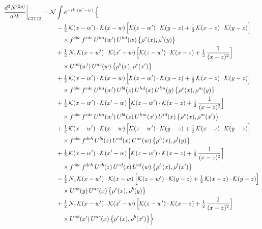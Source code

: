 \documentclass[10pt]{article}
\numberwithin{equation}{section}
\newcommand{\KK}{\mathcal K}
\newcommand{\NN}{\mathcal N}
\begin{document}
\begin{align}
\frac{d^3N^{(2\rho)}}{d^3k}\bigg|_{\rm GII.I2}={}&\NN\int e^{-ik\cdot(w'-w)}\,\Big\{\notag\\
&\quad -\tfrac12\,\KK(x-w')\cdot\KK(x-w)\,\Big[\KK(z-w')\cdot\KK(y-z)+\tfrac12\,\KK(x-z)\cdot\KK(y-z)\Big]\notag\\
&\qquad\times f^{abc}\,f^{cde}\,U^{ha}(w')\,U^{hd}(w)\,\big\{\rho^{e}(x),\rho^{b}(y)\big\}\notag\\
&\quad +\tfrac12\,N_{c}\,\KK(x-w')\cdot\KK(x'-w)\,\Big[\KK(z-w')\cdot\KK(x-z)+\tfrac12\,\frac{1}{(x-z)^2}\Big]\notag\\
&\qquad\times U^{ab}(w')\,U^{ac}(w)\,\big\{\rho^{b}(x),\rho^{c}(x')\big\}\notag\\
&\quad +\tfrac12\,\KK(x-w')\cdot\KK(x-w)\,\Big[\KK(z-w')\cdot\KK(y-z)+\tfrac12\,\KK(x-z)\cdot\KK(y-z)\Big]\notag\\
&\qquad\times f^{abc}\,f^{cde}\,U^{ha}(w')\,U^{bl}(z)\,U^{hd}(x)\,U^{lm}(y)\,\big\{\rho^{e}(x),\rho^{m}(y)\big\}\notag\\
&\quad +\tfrac12\,\KK(x-w')\cdot\KK(x'-w)\,\Big[\KK(z-w')\cdot\KK(x-z)+\tfrac12\,\frac{1}{(x-z)^2}\Big]\notag\\
&\qquad\times f^{abc}\,f^{cde}\,U^{ha}(w')\,U^{bl}(z)\,U^{hm}(x')\,U^{ld}(x)\,\big\{\rho^{e}(x),\rho^{m}(x')\big\}\notag\\
&\quad +\tfrac12\,\KK(x-w')\cdot\KK(x-w)\,\Big[\KK(z-w')\cdot\KK(y-z)+\tfrac12\,\KK(x-z)\cdot\KK(y-z)\Big]\notag\\
&\qquad\times f^{abc}\,f^{deh}\,U^{lb}(z)\,U^{cd}(x)\,U^{ae}(w)\,\big\{\rho^{h}(x),\rho^{l}(y)\big\}\notag\\
&\quad +\tfrac12\,\KK(x-w')\cdot\KK(x'-w)\,\Big[\KK(z-w')\cdot\KK(x-z)+\tfrac12\,\frac{1}{(x-z)^2}\Big]\notag\\
&\qquad\times f^{abc}\,f^{deh}\,U^{eb}(z)\,U^{cd}(x)\,U^{al}(w)\,\big\{\rho^{h}(x),\rho^{l}(x')\big\}\notag\\
&\quad -\tfrac12\,N_{c}\,\KK(x-w')\cdot\KK(x-w)\,\Big[\KK(z-w')\cdot\KK(y-z)+\tfrac12\,\KK(x-z)\cdot\KK(y-z)\Big]\notag\\
&\qquad\times U^{ab}(y)\,U^{ac}(x)\,\big\{\rho^{c}(x),\rho^{b}(y)\big\}\notag\\
&\quad +\tfrac12\,N_{c}\,\KK(x-w')\cdot\KK(x'-w)\,\Big[\KK(z-w')\cdot\KK(x-z)+\tfrac12\,\frac{1}{(x-z)^2}\Big]\notag\\
&\qquad\times U^{ab}(x')\,U^{ac}(x)\,\big\{\rho^{c}(x),\rho^{b}(x')\big\}\Big\}\label{eq:sum-GII.I2}
\end{align}
\end{document}

